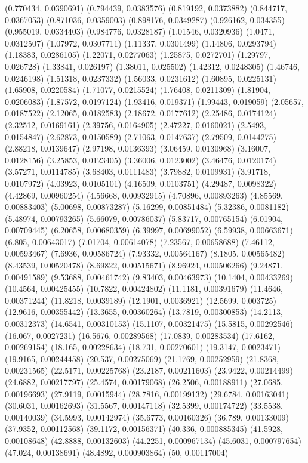 {(0.770434, 0.0390691)
(0.794439, 0.0383576)
(0.819192, 0.0373882)
(0.844717, 0.0367053)
(0.871036, 0.0359003)
(0.898176, 0.0349287)
(0.926162, 0.034355)
(0.955019, 0.0334403)
(0.984776, 0.0328187)
(1.01546, 0.0320936)
(1.0471, 0.0312507)
(1.07972, 0.0307711)
(1.11337, 0.0301499)
(1.14806, 0.0293794)
(1.18383, 0.0286105)
(1.22071, 0.0277063)
(1.25875, 0.0272701)
(1.29797, 0.026728)
(1.33841, 0.026197)
(1.38011, 0.025502)
(1.42312, 0.0248305)
(1.46746, 0.0246198)
(1.51318, 0.0237332)
(1.56033, 0.0231612)
(1.60895, 0.0225131)
(1.65908, 0.0220584)
(1.71077, 0.0215524)
(1.76408, 0.0211309)
(1.81904, 0.0206083)
(1.87572, 0.0197124)
(1.93416, 0.019371)
(1.99443, 0.019059)
(2.05657, 0.0187522)
(2.12065, 0.0182583)
(2.18672, 0.0177612)
(2.25486, 0.0174124)
(2.32512, 0.0169161)
(2.39756, 0.0164905)
(2.47227, 0.0160021)
(2.5493, 0.0154847)
(2.62873, 0.0150589)
(2.71063, 0.0147637)
(2.79509, 0.0144275)
(2.88218, 0.0139647)
(2.97198, 0.0136393)
(3.06459, 0.0130968)
(3.16007, 0.0128156)
(3.25853, 0.0123405)
(3.36006, 0.0123002)
(3.46476, 0.0120174)
(3.57271, 0.0114785)
(3.68403, 0.0111483)
(3.79882, 0.0109931)
(3.91718, 0.0107972)
(4.03923, 0.0105101)
(4.16509, 0.0103751)
(4.29487, 0.0098322)
(4.42869, 0.00960254)
(4.56668, 0.00932915)
(4.70896, 0.00893263)
(4.85569, 0.00883403)
(5.00698, 0.00873287)
(5.16299, 0.00851484)
(5.32386, 0.0081182)
(5.48974, 0.00793265)
(5.66079, 0.00786037)
(5.83717, 0.00765154)
(6.01904, 0.00709445)
(6.20658, 0.00680359)
(6.39997, 0.00699052)
(6.59938, 0.00663671)
(6.805, 0.00643017)
(7.01704, 0.00614078)
(7.23567, 0.00658688)
(7.46112, 0.00593467)
(7.6936, 0.00586724)
(7.93332, 0.00564167)
(8.1805, 0.00565482)
(8.43539, 0.00520478)
(8.69822, 0.00515671)
(8.96924, 0.00506266)
(9.24871, 0.00491589)
(9.53688, 0.00461742)
(9.83403, 0.00463973)
(10.1404, 0.00433269)
(10.4564, 0.00425455)
(10.7822, 0.00424802)
(11.1181, 0.00391679)
(11.4646, 0.00371244)
(11.8218, 0.0039189)
(12.1901, 0.0036921)
(12.5699, 0.003725)
(12.9616, 0.00355442)
(13.3655, 0.00360264)
(13.7819, 0.00300853)
(14.2113, 0.00312373)
(14.6541, 0.00310153)
(15.1107, 0.00321475)
(15.5815, 0.00292546)
(16.067, 0.0027231)
(16.5676, 0.00289568)
(17.0839, 0.00283534)
(17.6162, 0.00269154)
(18.165, 0.00228634)
(18.731, 0.00270601)
(19.3147, 0.0023471)
(19.9165, 0.00244458)
(20.537, 0.00275069)
(21.1769, 0.00252959)
(21.8368, 0.00231565)
(22.5171, 0.00225768)
(23.2187, 0.00211603)
(23.9422, 0.00214499)
(24.6882, 0.00217797)
(25.4574, 0.00179068)
(26.2506, 0.00188911)
(27.0685, 0.00196693)
(27.9119, 0.0015944)
(28.7816, 0.00199132)
(29.6784, 0.00163041)
(30.6031, 0.00162693)
(31.5567, 0.00147118)
(32.5399, 0.00174722)
(33.5538, 0.00140039)
(34.5993, 0.00142974)
(35.6773, 0.00160326)
(36.789, 0.00133009)
(37.9352, 0.00112568)
(39.1172, 0.00156371)
(40.336, 0.000885345)
(41.5928, 0.00108648)
(42.8888, 0.00132603)
(44.2251, 0.000967134)
(45.6031, 0.000797654)
(47.024, 0.00138691)
(48.4892, 0.000903864)
(50, 0.00117004)
}

